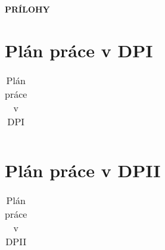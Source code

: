 \documentclass[12pt,a4paper,oneside,openright]{report}
\begin{document}

\clearpage
{}
{}



\newpage
\thispagestyle{empty}
\vspace*{10cm}
\hspace*{5cm}
\textbf{\LARGE{PRÍLOHY}}

\addappheadtotoc
\def\appendixname{}
\appendix

\newpage
{}


\chapter{Plán práce v DPI}
	\begin{table}[h]
		\centering
		\caption{Plán práce v DPI}
		\label{t:plan_prace1}
		\noindent\begin{tabular}{|c|c|c|l|}
	
			
		\end{tabular}
	\end{table}

\chapter{Plán práce v DPII}
\begin{table}[h]
	\centering
	\caption{Plán práce v DPII}
	\label{t:plan_prace2}
	\noindent\begin{tabular}{|c|c|c|l|}
		
		
	\end{tabular}
\end{table}
\end{document}
